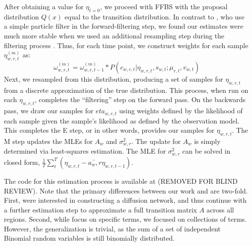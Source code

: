 After obtaining a value for $\eta_{t=0}$, we proceed with FFBS with the proposal distribution $Q(x)$ equal to the transition distribution. In contrast to \cite{eisenstein_diffusion_2014}, who use a simple particle filter in the forward-filtering step, we found our estimates were much more stable when we used an additional resampling step during the filtering process  \citep{arulampalam_tutorial_2002}. Thus, for each time point, we construct weights for each sample $\eta_{w,r,t}^{(m)}$ as:
\begin{equation} 
\omega_{w,r,t}^{(m)} = \omega_{w,r,t-1}^{(m)} * P(c_{w,r,t} | \eta_{w,r,t}, s_{w,t}; \mu_{r,t}, v_{w,t}) \label{eq:s}
\end{equation}
Next, we resampled from this distribution, producing a set of samples for $\eta_{w,r,t}$ from a discrete approximation of the true distribution. This process, when run on each $\eta_{w,r,t}$, completes the ``filtering'' step on the forward pass.  On the backwards pass, we draw our samples for $eta_{w,r,t}$ using weights defined by the likelihood of each sample given the sample's likelihood as defined by the observation model. This completes the E step, or in other words, provides our samples for $\eta_{w,r,t}$. The M step updates the MLEs for $A_{w}$ and $\sigma^2_{w,r}$. The update for $A_w$ is simply determined via least-squares estimation. The MLE for $\sigma^2_{w,r}$ can be solved in closed form, $\frac{1}{T}\sum_t^T(\eta_{w,r,t} - \tilde{a_w,r}\eta_{w,r,t-1})$.

The code for this estimation process is available at (REMOVED FOR BLIND REVIEW).  Note that the primary differences between our work and \cite{eisenstein_diffusion_2014} are two-fold. First, \cite{eisenstein_diffusion_2014} were interested in constructing a diffusion network, and thus continue with a further estimation step to approximate a full transition matrix $A$ across all regions.  Second, while \cite{eisenstein_diffusion_2014} focus on specific terms, we focused on collections of terms. However, the generalization is trivial, as the sum of a set of independent Binomial random variables is still binomially distributed.
